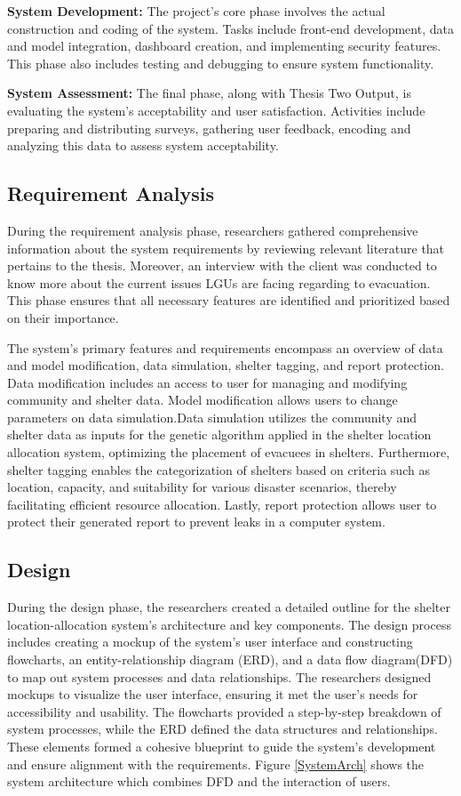 	\textbf{System Development:} The project's core phase involves the actual construction and coding of the system. Tasks include front-end development, data and model integration, dashboard creation, and implementing security features. This phase also includes testing and debugging to ensure system functionality.
	
	\textbf{System Assessment:} The final phase, along with Thesis Two Output, is evaluating the system's acceptability and user satisfaction. Activities include preparing and distributing surveys, gathering user feedback, encoding and analyzing this data to assess system acceptability.

\subsection{Requirement Analysis}
	During the requirement analysis phase, researchers gathered comprehensive information about the system requirements by reviewing relevant literature that pertains to the thesis. Moreover, an interview with the client was conducted to know more about the current issues LGUs are facing regarding to evacuation. This phase ensures that all necessary features are identified and prioritized based on their importance.
	
	The system's primary features and requirements encompass an overview of data and model modification, data simulation, shelter tagging, and report protection. Data modification includes an access to user for managing and modifying community and shelter data. Model modification allows users to change parameters on data simulation.Data simulation utilizes the community and shelter data as inputs for the genetic algorithm applied in the shelter location allocation system, optimizing the placement of evacuees in shelters. Furthermore, shelter tagging enables the categorization of shelters based on criteria such as location, capacity, and suitability for various disaster scenarios, thereby facilitating efficient resource allocation. Lastly, report protection allows user to protect their generated report to prevent leaks in a computer system.
	
\subsection{Design}
	During the design phase, the researchers created a detailed outline for the shelter location-allocation system's architecture and key components. The design process includes creating a mockup of the system's user interface and constructing flowcharts, an entity-relationship diagram (ERD), and a data flow diagram(DFD) to map out system processes and data relationships. The researchers designed mockups to visualize the user interface, ensuring it met the user's needs for accessibility and usability. The flowcharts provided a step-by-step breakdown of system processes, while the ERD defined the data structures and relationships. These elements formed a cohesive blueprint to guide the system's development and ensure alignment with the requirements. Figure \ref{SystemArch} shows the system architecture which combines DFD and the interaction of users.


